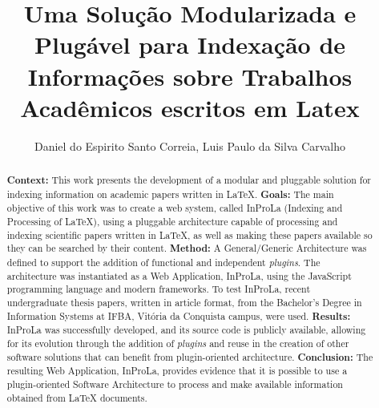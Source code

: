 \documentclass[12pt]{article}
\title{Uma Solução Modularizada e Plugável para Indexação de Informações sobre Trabalhos Acadêmicos escritos em Latex}
\author{Daniel do Espirito Santo Correia, Luis Paulo da Silva Carvalho}%
\begin{document}
 

\maketitle

\begin{abstract}
\textbf{Context:} This work presents the development of a modular and pluggable solution for indexing information on academic papers written in LaTeX. \textbf{Goals:} The main objective of this work was to create a web system, called InProLa (Indexing and Processing of LaTeX), using a pluggable architecture capable of processing and indexing scientific papers written in LaTeX, as well as making these papers available so they can be searched by their content. \textbf{Method:} A General/Generic Architecture was defined to support the addition of functional and independent \textit{plugins}. The architecture was instantiated as a Web Application, InProLa, using the JavaScript programming language and modern frameworks. To test InProLa, recent undergraduate thesis papers, written in article format, from the Bachelor's Degree in Information Systems at IFBA, Vitória da Conquista campus, were used. \textbf{Results:} InProLa was successfully developed, and its source code is publicly available, allowing for its evolution through the addition of \textit{plugins} and reuse in the creation of other software solutions that can benefit from plugin-oriented architecture. \textbf{Conclusion:} The resulting Web Application, InProLa, provides evidence that it is possible to use a plugin-oriented Software Architecture to process and make available information obtained from LaTeX documents.

\end{abstract}
\end{document}

